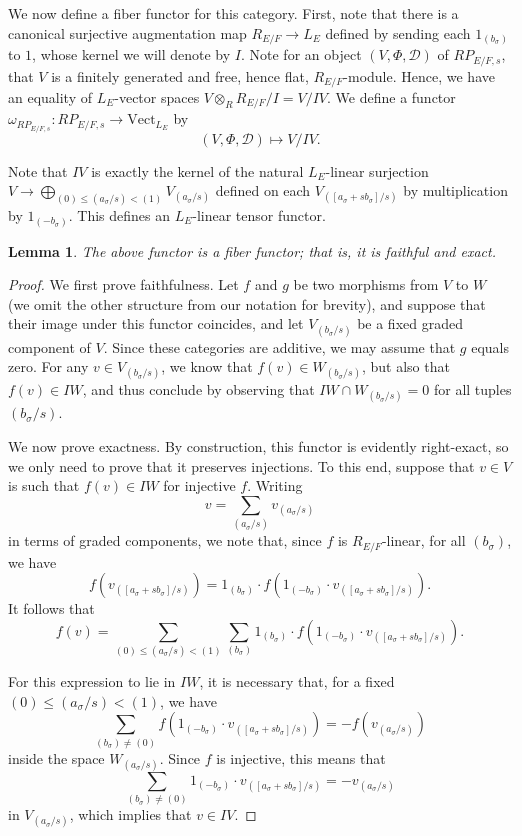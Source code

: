 \documentclass[11pt]{amsart}
\newtheorem{lem}[thm]{Lemma}
\theoremstyle{definition}
\newcommand{\mc}{\mathcal}
\newcommand{\Vect}{\mathrm{Vect}}
\begin{document}
We now define a fiber functor for this category. First, note that there is a canonical surjective augmentation map $R_{E/F} \to L_{E}$ defined by sending each $1_{(b_{\sigma})}$ to $1$, whose kernel we will denote by $I$. Note for an object $(V, \Phi, \mc{D})$ of $RP_{E/F,s}$, that $V$ is a finitely generated and free, hence flat, $R_{E/F}$-module. Hence, we have an equality of $L_{E}$-vector spaces $V \otimes_{R} R_{E/F}/I = V/IV$. We define a functor $\omega_{RP_{E/F, s}}: RP_{E/F, s} \to \Vect_{L_E}$ by
\begin{equation*}
    (V, \Phi, \mc{D}) \mapsto V/IV.
\end{equation*}

Note that $IV$ is exactly the kernel of the natural $L_{E}$-linear surjection $V \to \bigoplus_{(0) \leq (a_{\sigma}/s) < (1)} V_{(a_{\sigma}/s)}$ defined on each $V_{([a_{\sigma}+sb_{\sigma}]/s)}$ by multiplication by $1_{(-b_{\sigma})}$. This defines an $L_{E}$-linear tensor functor. 

\begin{lem}\label{exactlem1} The above functor is a fiber functor; that is, it is faithful and exact.
\end{lem}

\begin{proof} We first prove faithfulness. Let $f$ and $g$ be two morphisms from $V$ to $W$ (we omit the other structure from our notation for brevity), and suppose that their image under this functor coincides, and let $V_{(b_{\sigma}/s)}$ be a fixed graded component of $V$. Since these categories are additive, we may assume that $g$ equals zero. For any $v \in  V_{(b_{\sigma}/s)}$, we know that $f(v) \in W_{(b_{\sigma}/s)}$, but also that $f(v) \in IW$, and thus conclude by observing that $IW \cap W_{(b_{\sigma}/s)}= 0$ for all tuples $(b_{\sigma}/s)$.

We now prove exactness. By construction, this functor is evidently right-exact, so we only need to prove that it preserves injections. To this end, suppose that $v \in V$ is such that $f(v) \in IW$ for injective $f$. Writing $$v = \sum_{(a_{\sigma}/s)} v_{(a_{\sigma}/s)}$$ in terms of graded components, we note that, since $f$ is $R_{E/F}$-linear, for all $(b_{\sigma})$, we have $$f(v_{([a_{\sigma} + sb_{\sigma}]/s)}) = 1_{(b_{\sigma})} \cdot f(1_{(-b_{\sigma})} \cdot v_{([a_{\sigma} + sb_{\sigma}]/s)}).$$ It follows that $$f(v) = \sum_{(0) \leq (a_{\sigma}/s) < (1)} \sum_{(b_{\sigma})} 1_{(b_{\sigma})} \cdot f(1_{(-b_{\sigma})} \cdot v_{([a_{\sigma} + sb_{\sigma}]/s)}).$$ 

For this expression to lie in $IW$, it is necessary that, for a fixed $(0) \leq (a_{\sigma}/s) < (1)$, we have $$\sum_{(b_{\sigma}) \neq (0)} f(1_{(-b_{\sigma})} \cdot v_{([a_{\sigma} + sb_{\sigma}]/s)}) = -f(v_{(a_{\sigma}/s)})$$ inside the space $W_{(a_{\sigma}/s)}$. Since $f$ is injective, this means that $$\sum_{(b_{\sigma}) \neq (0)} 1_{(-b_{\sigma})} \cdot v_{([a_{\sigma} + sb_{\sigma}]/s)} = -v_{(a_{\sigma}/s)}$$ in $V_{(a_{\sigma}/s)}$, which implies that $v \in IV$.
\end{proof}
\end{document}
